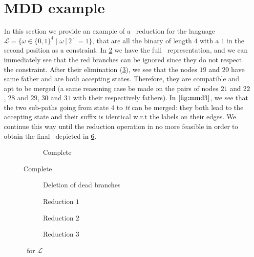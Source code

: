 \section{MDD example}
\label{sec:mdd_example}
In this section we provide an example of a \mdd\ reduction for the language $\mathcal{L} = \{\omega \in \{0, 1\}^4 \mid \omega[2] = 1\}$, that are all the binary of length $4$ with a $1$ in the second position as a constraint. In \cref{fig:mmd1} we have the full \mdd\ representation, and we can immediately see that the red branches can be ignored since they do not respect the constraint. After their elimination (\cref{fig:mmd2}), we see that the nodes $19$ and $20$ have same father and are both accepting states. Therefore, they are compatible and apt to be merged (a same reasoning case be made on the pairs of nodes $21$ and $22$, $28$ and $29$, $30$ and $31$ with their respectively fathers). In $\cref{fig:mmd3}$, we see that the two sub-paths going from state $4$ to \textit{tt} can be merged: they both lead to the accepting state and their suffix is identical w.r.t the labels on their edges. We continue this way until the reduction operation in no more feasible in order to obtain the final \mdd\ depicted in \cref{fig:mmd5}.

\begin{figure}[!htb]
	\centering
	\begin{subfigure}[b]{1\linewidth}
		\centering
		\scalebox{.8}{
			
		}
		\caption{Complete \mdd}
		\label{fig:mmd1}
	\end{subfigure}
\end{figure}

\begin{figure}[!htb]\ContinuedFloat
	\def\scale{.65}
	\centering
	\begin{subfigure}[b]{.34\linewidth}
		\centering
		\scalebox{\scale}{
			
		}
		\caption{Deletion of dead branches}
		\label{fig:mmd2}
	\end{subfigure}
	\hfill
	\begin{subfigure}[b]{.34\linewidth}
		\centering
		\scalebox{\scale}{
			
		}
		\caption{Reduction $1$}
		\label{fig:mmd3}
	\end{subfigure}
	\hfil
	\begin{subfigure}[b]{.15\linewidth}
		\centering
		\scalebox{\scale}{
			
		}
		\caption{Reduction $2$}
		\label{fig:mmd4}
	\end{subfigure}
	\hfill
	\begin{subfigure}[b]{.15\linewidth}
		\centering
		\scalebox{\scale}{
			
		}
		\caption{Reduction $3$}
		\label{fig:mmd5}
	\end{subfigure}

	\caption{\mdd\ for $\mathcal{L}$}
	\label{fig:mmd}
\end{figure}